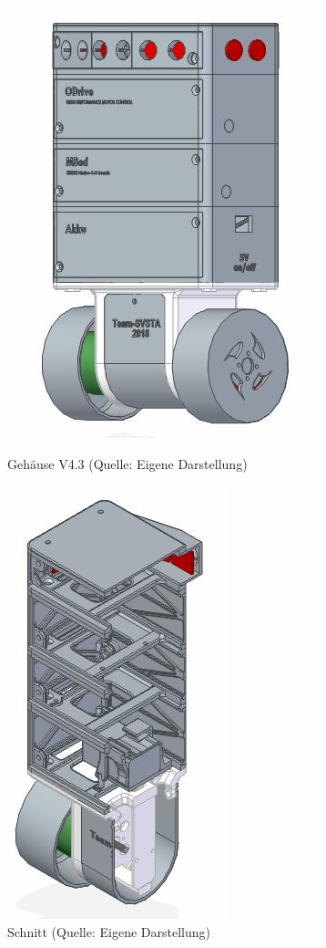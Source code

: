 \begin{figure}[htb]
	\centering
	\begin{minipage}{0.45\linewidth}
		\centering
		\includegraphics[scale=0.48]{images/V.4.3.jpg}
		\caption{Gehäuse V4.3 \newline(Quelle: Eigene Darstellung)}
		\label{gehaeuse-v4.3}
	\end{minipage}
	\begin{minipage}{0.45\linewidth}
		\centering
		\includegraphics[scale=0.48]{images/V.4.3-1.jpg}
		\caption{ Schnitt \newline (Quelle: Eigene Darstellung)}
	\end{minipage}
\end{figure}
\pagebreak
